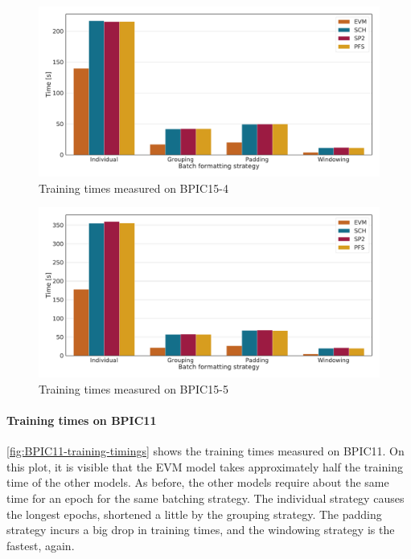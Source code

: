 \begin{figure}[!htb]
    \centering
    \includegraphics[width=\textwidth]{gfx/bpic2015_4/train_timings.pdf}
    \caption{Training times measured on BPIC15-4}
    \label{fig:BPIC15-4-training-timings}
\end{figure}
\begin{figure}[!htb]
    \centering
    \includegraphics[width=\textwidth]{gfx/bpic2015_5/train_timings.pdf}
    \caption{Training times measured on BPIC15-5}
    \label{fig:BPIC15-5-training-timings}
\end{figure}

\paragraph{Training times on BPIC11}
\autoref{fig:BPIC11-training-timings} shows the training times measured on BPIC11.
On this plot, it is visible that the EVM model takes approximately half the training time of the other models.
As before, the other models require about the same time for an epoch for the same batching strategy.
The individual strategy causes the longest epochs, shortened a little by the grouping strategy.
The padding strategy incurs a big drop in training times, and the windowing strategy is the fastest, again.

